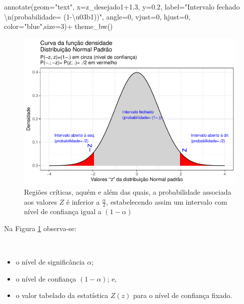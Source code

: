 \documentclass[
]{book}
\newenvironment{Shaded}{\begin{snugshade}}{\end{snugshade}}
\newcommand{\AttributeTok}[1]{\textcolor[rgb]{0.77,0.63,0.00}{#1}}
\newcommand{\DecValTok}[1]{\textcolor[rgb]{0.00,0.00,0.81}{#1}}
\newcommand{\FloatTok}[1]{\textcolor[rgb]{0.00,0.00,0.81}{#1}}
\newcommand{\FunctionTok}[1]{\textcolor[rgb]{0.00,0.00,0.00}{#1}}
\newcommand{\NormalTok}[1]{#1}
\newcommand{\SpecialCharTok}[1]{\textcolor[rgb]{0.00,0.00,0.00}{#1}}
\newcommand{\StringTok}[1]{\textcolor[rgb]{0.31,0.60,0.02}{#1}}
\providecommand{\tightlist}{%
  \setlength{\itemsep}{0pt}\setlength{\parskip}{0pt}}
\begin{document}
\begin{Shaded}
\begin{Highlighting}[]
  \FunctionTok{annotate}\NormalTok{(}\AttributeTok{geom=}\StringTok{"text"}\NormalTok{, }\AttributeTok{x=}\NormalTok{z\_desejado1}\FloatTok{+1.3}\NormalTok{, }\AttributeTok{y=}\FloatTok{0.2}\NormalTok{, }\AttributeTok{label=}\StringTok{"Intervalo fechado }\SpecialCharTok{\textbackslash{}n}\StringTok{(probabilidade= (1{-}\textbackslash{}u03b1))"}\NormalTok{, }\AttributeTok{angle=}\DecValTok{0}\NormalTok{, }\AttributeTok{vjust=}\DecValTok{0}\NormalTok{, }\AttributeTok{hjust=}\DecValTok{0}\NormalTok{, }\AttributeTok{color=}\StringTok{"blue"}\NormalTok{,}\AttributeTok{size=}\DecValTok{3}\NormalTok{)}\SpecialCharTok{+}
  \FunctionTok{theme\_bw}\NormalTok{()}
\end{Highlighting}
\end{Shaded}

\begin{figure}

{\centering \includegraphics[width=1\linewidth]{apostila_files/figure-latex/fig52-1} 

}

\caption{Regiões críticas, aquém e além das quais, a probabilidade associada aos valores $Z$ é inferior a $\frac{\alpha}{2}$, estabelecendo assim um intervalo com nível de confiança igual a $(1-\alpha)$}\label{fig:fig52}
\end{figure}

\hfill\break

Na Figura \ref{fig:fig52} observa-se:

~

\begin{itemize}
\tightlist
\item
  o nível de significância \(\alpha\);\\
\item
  o nível de confiança \((1-\alpha)\); e,\\
\item
  o valor tabelado da estatística \(Z(z)\) para o nível de confiança fixado.
\end{itemize}
\end{document}
